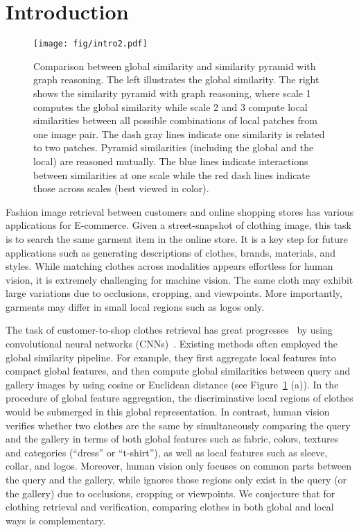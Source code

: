 \documentclass[10pt,twocolumn,letterpaper]{article}
\begin{document}
\section{Introduction}
\begin{figure}
\begin{minipage}[t]{1\linewidth}
\centering
\texttt{[image: fig/intro2.pdf]}
\label{fig:fig_intro_hs}
\end{minipage}
\caption{Comparison between global similarity and similarity pyramid with graph reasoning. The left illustrates the global similarity. The right shows the similarity pyramid with graph reasoning, where scale 1 computes the global similarity while scale 2 and 3 compute local similarities between all possible combinations of local patches from one image pair. The dash gray lines indicate one similarity is related to two patches. Pyramid similarities (including the global and the local) are reasoned mutually. The blue lines indicate interactions between similarities at one scale while the red dash lines indicate those across scales (best viewed in color). }
\label{fig:fig_intro}
\end{figure}


Fashion image retrieval between customers and online shopping stores has various applications for E-commerce. Given a street-snapshot of clothing image, this task is to search the same garment item in the online store. It is a key step for future applications such as generating descriptions of clothes, brands, materials, and styles. While matching clothes across modalities appears effortless for human vision, it is extremely challenging for machine vision. The same cloth may exhibit large variations due to occlusions, cropping, and viewpoints. More importantly, garments may differ in small local regions such as logos only.



The task of customer-to-shop clothes retrieval has great progresses~\cite{Huang2015,Kiapour2015,Liu2016,Ji2017,Song2017,Corbiere2017,Garcia2017,Cheng2017,Zhang2018} by using convolutional neural networks (CNNs)~\cite{krizhevsky2012imagenet,He2017,girshickICCV15fastrcnn,he2016deep,ren2015faster}.
Existing methods often employed the global similarity pipeline. For example, they first aggregate local features into compact global features, and then compute global similarities between query and gallery images by using cosine or Euclidean distance (see Figure~\ref{fig:fig_intro} (a)).
In the procedure of global feature aggregation, the discriminative local regions of clothes would be submerged in this global representation.
In contrast, human vision verifies whether two clothes are the same by simultaneously comparing the query and the gallery in terms of both global features such as fabric, colors, textures and categories (\eg ``dress'' or ``t-shirt''), as well as local features such as sleeve, collar, and logos. Moreover, human vision only focuses on common parts between the query and the gallery, while ignores those regions only exist in the query (or the gallery) due to occlusions, cropping or viewpoints. We conjecture that for clothing retrieval and verification, comparing clothes in both global and local ways is complementary.
\end{document}
